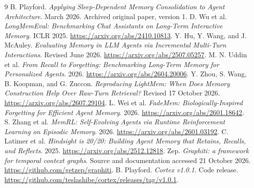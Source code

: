 \documentclass[11pt]{article}
\begin{document}
\begin{thebibliography}{9}
 B. Playford. \emph{Applying Sleep-Dependent Memory Consolidation to Agent Architecture}. March 2026. Archived original paper, version 1.
 D. Wu et al. \emph{LongMemEval: Benchmarking Chat Assistants on Long-Term Interactive Memory}. ICLR 2025. \url{https://arxiv.org/abs/2410.10813}.
 Y. Hu, Y. Wang, and J. McAuley. \emph{Evaluating Memory in LLM Agents via Incremental Multi-Turn Interactions}. Revised June 2026. \url{https://arxiv.org/abs/2507.05257}.
 M. N. Uddin et al. \emph{From Recall to Forgetting: Benchmarking Long-Term Memory for Personalized Agents}. 2026. \url{https://arxiv.org/abs/2604.20006}.
 Y. Zhou, S. Wang, B. Koopman, and G. Zuccon. \emph{Reproducing LightMem: When Does Memory Construction Help Over Raw-Turn Retrieval?} Revised 17 October 2026. \url{https://arxiv.org/abs/2607.29104}.
 L. Wei et al. \emph{FadeMem: Biologically-Inspired Forgetting for Efficient Agent Memory}. 2026. \url{https://arxiv.org/abs/2601.18642}.
 S. Zhang et al. \emph{MemRL: Self-Evolving Agents via Runtime Reinforcement Learning on Episodic Memory}. 2026. \url{https://arxiv.org/abs/2601.03192}.
 C. Latimer et al. \emph{Hindsight is 20/20: Building Agent Memory that Retains, Recalls, and Reflects}. 2025. \url{https://arxiv.org/abs/2512.12818}.
 Zep. \emph{Graphiti: a framework for temporal context graphs}. Source and documentation accessed 21 October 2026. \url{https://github.com/getzep/graphiti}.
 B. Playford. \emph{Cortex v1.0.1}. Code release. \url{https://github.com/teslashibe/cortex/releases/tag/v1.0.1}.
\end{thebibliography}
\end{document}
